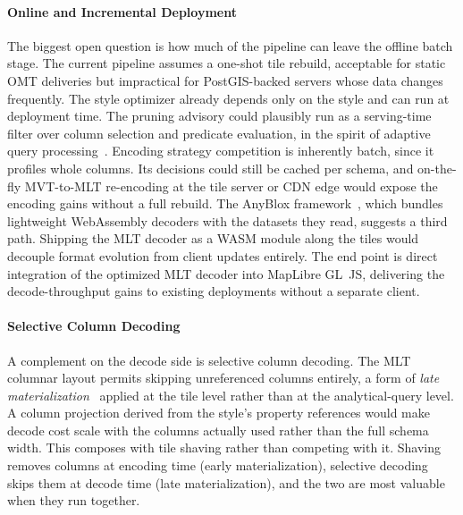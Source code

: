 \paragraph{Online and Incremental Deployment}
The biggest open question is how much of the pipeline can leave the offline batch stage.
The current pipeline assumes a one-shot tile rebuild, acceptable for static \ac{OMT} deliveries but impractical for PostGIS-backed servers whose data changes frequently.
The style optimizer already depends only on the style and can run at deployment time.
The pruning advisory could plausibly run as a serving-time filter over column selection and predicate evaluation, in the spirit of adaptive query processing~\cite{deshpandeAdaptiveQueryProcessing2006}.
Encoding strategy competition is inherently batch, since it profiles whole columns.
Its decisions could still be cached per schema, and on-the-fly \ac{MVT}-to-\ac{MLT} re-encoding at the tile server or \ac{CDN} edge would expose the encoding gains without a full rebuild.
The AnyBlox framework~\cite{gienieczkoAnyBloxFrameworkSelfDecoding2025}, which bundles lightweight WebAssembly decoders with the datasets they read, suggests a third path.
Shipping the \ac{MLT} decoder as a \ac{WASM} module along the tiles would decouple format evolution from client updates entirely.
The end point is direct integration of the optimized \ac{MLT} decoder into MapLibre GL~JS, delivering the decode-throughput gains to existing deployments without a separate client.

\paragraph{Selective Column Decoding}
A complement on the decode side is selective column decoding.
The \ac{MLT} columnar layout permits skipping unreferenced columns entirely, a form of \emph{late materialization}~\cite{abadiMaterializationStrategiesColumnOriented2007} applied at the tile level rather than at the analytical-query level.
A column projection derived from the style's property references would make decode cost scale with the columns actually used rather than the full schema width.
This composes with tile shaving rather than competing with it.
Shaving removes columns at encoding time (early materialization), selective decoding skips them at decode time (late materialization), and the two are most valuable when they run together.

